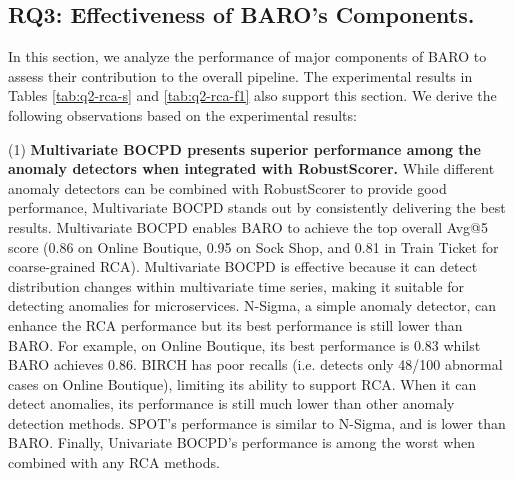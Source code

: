 \subsection{RQ3: Effectiveness of BARO's Components.} \label{exp:q3-robustness}

In this section, we analyze the performance of major components of BARO to assess their contribution to the overall pipeline. The experimental results in Tables \ref{tab:q2-rca-s} and \ref{tab:q2-rca-f1} also support this section. We derive the following observations based on the experimental results:

(1) \textbf{Multivariate BOCPD presents superior performance among the anomaly detectors when integrated with RobustScorer.} While different anomaly detectors can be combined with RobustScorer to provide good performance, Multivariate BOCPD stands out by consistently delivering the best results. Multivariate BOCPD enables BARO to achieve the top overall Avg@5 score (0.86 on Online Boutique, 0.95 on Sock Shop, and 0.81 in Train Ticket for coarse-grained RCA). Multivariate BOCPD is effective because it can detect distribution changes within multivariate time series, making it suitable for detecting anomalies for microservices. N-Sigma, a simple anomaly detector, can enhance the RCA performance but its best performance %
is still lower than BARO. For example, on Online Boutique, its best performance is 0.83 whilst BARO achieves 0.86. BIRCH has poor recalls (i.e. detects only 48/100 abnormal cases on Online Boutique), limiting its ability to support RCA. When it can detect anomalies, its performance is still much lower than other anomaly detection methods. SPOT's performance is similar to N-Sigma, and is lower than BARO. 
Finally, Univariate BOCPD's performance is among the worst when combined with any RCA methods.

